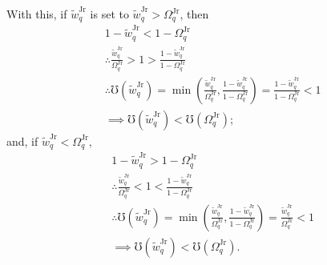\documentclass[hidelinks, nonatbib]{elsarticle}
\begin{document}
\begin{enumerate}
    With this, if $\tilde{w}_{q}^{\text{Jr}}$ is set to $\tilde{w}_{q}^{\text{Jr}} > \Omega_{q}^{\text{Jr}}$, then
    \begin{align}
        &
        1 - \tilde{w}_{q}^{\text{Jr}}
        <
        1 - \Omega_{q}^{\text{Jr}}
        \\
        &\therefore
        \frac{
            \tilde{w}_{q}^{\text{Jr}}
        }{
            \Omega_{q}^{\text{Jr}}
        }
        >
        1
        >
        \frac{
            1 - \tilde{w}_{q}^{\text{Jr}}
        }{
            1 - \Omega_{q}^{\text{Jr}}
        }
        \\
        &\therefore
        \mho(\tilde{w}_{q}^{\text{Jr}}) 
        =
        \min\left(
            \frac{
                \tilde{w}_{q}^{\text{Jr}}
            }{
                \Omega_{q}^{\text{Jr}}
            }
            ,
            \frac{
                1 - \tilde{w}_{q}^{\text{Jr}}
            }{
                1 - \Omega_{q}^{\text{Jr}}
            }
        \right)
        =
        \frac{
            1 - \tilde{w}_{q}^{\text{Jr}}
        }{
            1 - \Omega_{q}^{\text{Jr}}
        }
        <
        1
        \\
        &\implies
        \mho(\tilde{w}_{q}^{\text{Jr}})
        <
        \mho(\Omega_{q}^{\text{Jr}})
        ;
    \end{align}
    and, if $\tilde{w}_{q}^{\text{Jr}} < \Omega_{q}^{\text{Jr}}$,
    \begin{align}
        &
        1 - \tilde{w}_{q}^{\text{Jr}}
        >
        1 - \Omega_{q}^{\text{Jr}}
        \\
        &\therefore
        \frac{
            \tilde{w}_{q}^{\text{Jr}}
        }{
            \Omega_{q}^{\text{Jr}}
        }
        <
        1
        <
        \frac{
            1 - \tilde{w}_{q}^{\text{Jr}}
        }{
            1 - \Omega_{q}^{\text{Jr}}
        }
        \\
        &\therefore
        \mho(\tilde{w}_{q}^{\text{Jr}}) 
        =
        \min\left(
            \frac{
                \tilde{w}_{q}^{\text{Jr}}
            }{
                \Omega_{q}^{\text{Jr}}
            }
            ,
            \frac{
                1 - \tilde{w}_{q}^{\text{Jr}}
            }{
                1 - \Omega_{q}^{\text{Jr}}
            }
        \right)
        =
        \frac{
            \tilde{w}_{q}^{\text{Jr}}
        }{
            \Omega_{q}^{\text{Jr}}
        }
        <
        1
        \\
        &\implies
        \mho(\tilde{w}_{q}^{\text{Jr}})
        <
        \mho(\Omega_{q}^{\text{Jr}})
        .
    \end{align}


\end{enumerate}
\end{document}
